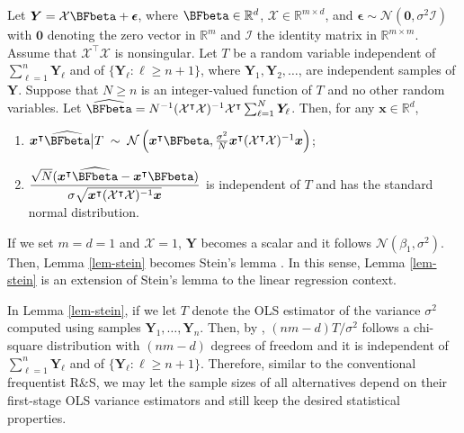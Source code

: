 \documentclass[ijoc,nonblindrev]{informs3}
\def\bx{{\bm x}}
\def\bY{{\bm Y}}
\def\cN{{\mathcal N}}
\def\cX{{\mathcal X}}
\def\cI{{\mathcal I}}
\begin{document}
\begin{lemma} \label{lem-stein}
Let $\bY = \cX \BFbeta + \bm \epsilon$, where $\BFbeta \in \mathbb{R}^d$, $\cX \in \mathbb{R}^{m\times d}$, and $\bm \epsilon \sim \cN(\bm 0, \sigma^2 \cI)$ with $\bm 0$ denoting the zero vector in $\mathbb{R}^m$ and $\cI$ the identity matrix in $\mathbb{R}^{m\times m}$.
Assume that $\cX^\intercal \cX$ is nonsingular.
Let $T$ be a random variable independent  of $\sum_{\ell=1}^n \bY_\ell$ and of $\{\bY_\ell:\ell \geq n+1\}$, where $\bY_1, \bY_2, \ldots$, are independent samples of $\bY$.
Suppose that $N\geq n$ is an integer-valued function of $T$ and no other random variables.
Let $\widehat{\BFbeta} =N^{-1} (\cX^\intercal \cX)^{-1} \cX^\intercal \sum_{\ell=1}^{N} \bY_{\ell}$.
Then, for any $\bx \in \mathbb{R}^d$,
\begin{enumerate}[label=(\roman*)]
\item
$\bx^\intercal \widehat{\BFbeta} \big| T\; \sim\;  \cN \left(\bx^\intercal \BFbeta, \frac{\sigma^2}{N}\bx^\intercal (\cX^\intercal \cX)^{-1} \bx \right)$;
\item
\vspace{3pt}
$ \displaystyle \frac{\sqrt{N} (\bx^\intercal \widehat{\BFbeta} - \bx^\intercal \BFbeta)}{\sigma \sqrt{\bx^\intercal (\cX^\intercal \cX)^{-1} \bx}}$  is independent of $T$ and has the standard normal distribution.
\end{enumerate}
\end{lemma}

\vspace{6pt}
\begin{remark}
If we set $m=d=1$ and $\cX=1$, $\bY$ becomes a scalar and it follows $\cN(\beta_1,\sigma^2)$.
Then, Lemma \ref{lem-stein} becomes Stein's lemma \citep{stein1945}.
In this sense, Lemma \ref{lem-stein} is an extension of Stein's lemma to the linear regression context.
\end{remark}

\begin{remark} \label{remark:T}
In Lemma \ref{lem-stein}, if we let $T$ denote the OLS estimator of the variance $\sigma^2$ computed using samples $\bY_1,\ldots,\bY_n$.
Then, by \citet[Theorem 7.6b]{RencherSchaalje08}, $(nm-d)T/\sigma^2$ follows a chi-square distribution with $(nm-d)$ degrees of freedom and it is independent of $\sum_{\ell=1}^n \bY_\ell$ and of $\{\bY_\ell:\ell \geq n+1\}$.
Therefore, similar to the conventional frequentist R\&S, we may let the sample sizes of all alternatives depend on their first-stage OLS variance estimators and still keep the desired statistical properties.
\end{remark}
\end{document}
